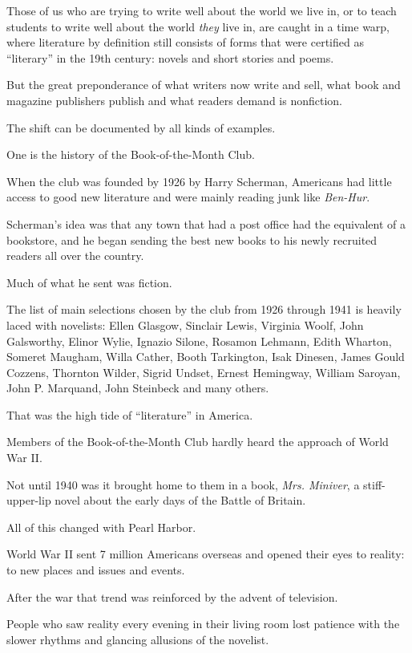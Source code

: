 \documentclass{book}
\numberwithin{equation}{section}
\begin{document}
Those of us who are trying to write well about the world we live in, or to teach students to write well about the world \textit{they} live in, are caught in a time warp, where literature by definition still consists of forms that were certified as ``literary'' in the 19th century: novels and short stories and poems.

But the great preponderance of what writers now write and sell, what book and magazine publishers publish and what readers demand is nonfiction.

%
The shift can be documented by all kinds of examples.

One is the history of the Book-of-the-Month Club.

When the club was founded by 1926 by Harry Scherman, Americans had little access to good new literature and were mainly reading junk like \textit{Ben-Hur}.

Scherman's idea was that any town that had a post office had the equivalent of a bookstore, and he began sending the best new books to his newly recruited readers all over the country.

%
Much of what he sent was fiction.

The list of main selections chosen by the club from 1926 through 1941 is heavily laced with novelists: Ellen Glasgow, Sinclair Lewis, Virginia Woolf, John Galsworthy, Elinor Wylie, Ignazio Silone, Rosamon Lehmann, Edith Wharton, Someret Maugham, Willa Cather, Booth Tarkington, Isak Dinesen, James Gould Cozzens, Thornton Wilder, Sigrid Undset, Ernest Hemingway, William Saroyan, John P. Marquand, John Steinbeck and many others.

That was the high tide of ``literature'' in America.

Members of the Book-of-the-Month Club hardly heard the approach of World War II.

Not until 1940 was it brought home to them in a book, \textit{Mrs. Miniver}, a stiff-upper-lip novel about the early days of the Battle of Britain.

%
All of this changed with Pearl Harbor.

World War II sent 7 million Americans overseas and opened their eyes to reality: to new places and issues and events.

After the war that trend was reinforced by the advent of television.

People who saw reality every evening in their living room lost patience with the slower rhythms and glancing allusions of the novelist.
\end{document}
